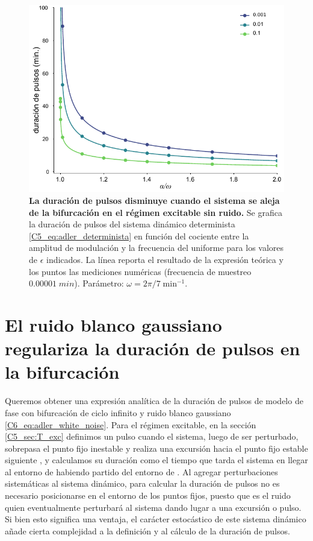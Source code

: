 \documentclass[./main.tex]{subfiles}
\begin{document}
 \begin{figure}
    \centering
    \includegraphics[width=1\columnwidth]{figures/chapter5/C5_T_exc.pdf} 
    \caption{\textbf{La duración de pulsos disminuye cuando el sistema se aleja de la bifurcación en el régimen excitable sin ruido.} Se grafica la duración de pulsos del sistema dinámico determinista \ref{C5_eq:adler_determinista} en función del cociente entre la amplitud de modulación y la frecuencia del uniforme \dddelta para los valores de $\epsilon$ indicados. La línea reporta el resultado de la expresión teórica y los puntos las mediciones numéricas (frecuencia de muestreo $0.00001\; min$). Parámetro: $\omega=2\pi/7\;\text{min}^{-1}$.}
    \label{C5_fig:T_exc_res}
\end{figure}


\section{El ruido blanco gaussiano regulariza la duración de pulsos en la bifurcación}
\label{C6_sec:duracion}


Queremos obtener una expresión analítica de la duración de pulsos de modelo de fase con bifurcación de ciclo infinito y ruido blanco gaussiano \ref{C6_eq:adler_white_noise}. Para el régimen excitable, en la sección \ref{C5_sec:T_exc} definimos un pulso cuando el sistema, luego de ser perturbado, sobrepasa el punto fijo inestable \xxi y realiza una excursión hacia el punto fijo estable siguiente \xxe, y calculamos su duración como el tiempo que tarda el sistema en llegar al entorno de \xxe habiendo partido del entorno de \xxi. Al agregar perturbaciones sistemáticas al sistema dinámico, para calcular la duración de pulsos no es necesario posicionarse en el entorno de los puntos fijos, puesto que es el ruido quien eventualmente perturbará al sistema dando lugar a una excursión o pulso. Si bien esto significa una ventaja, el carácter estocástico de este sistema dinámico añade cierta complejidad a la definición y al cálculo de la duración de pulsos. 
\end{document}

